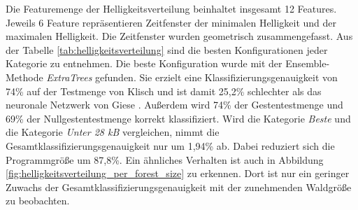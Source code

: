 Die Featuremenge der Helligkeitsverteilung beinhaltet insgesamt 12 Features. Jeweils 6 Feature repräsentieren Zeitfenster der minimalen Helligkeit und der maximalen Helligkeit. Die Zeitfenster wurden
geometrisch zusammengefasst.
\newline
\newline
Aus der Tabelle \ref{tab:helligkeitsverteilung} sind die besten Konfigurationen jeder Kategorie zu entnehmen. Die beste Konfiguration wurde mit der Ensemble-Methode \textit{ExtraTrees} gefunden.
Sie erzielt eine Klassifizierungsgenauigkeit von 74\% auf der Testmenge von Klisch und ist damit 25,2\% schlechter als das neuronale Netzwerk von Giese \cite{gieseThesis}. Außerdem wird 74\% der Gestentestmenge
und 69\% der Nullgestentestmenge korrekt klassifiziert.
\newline
\newline
Wird die Kategorie \textit{Beste} und die Kategorie \textit{Unter 28 kB} vergleichen, nimmt die Gesamtklassifizierungsgenauigkeit nur um 1,94\% ab. Dabei reduziert sich die Programmgröße um 87,8\%.
Ein ähnliches Verhalten ist auch in Abbildung \ref{fig:helligkeitsverteilung_per_forest_size} zu erkennen. Dort ist nur ein geringer Zuwachs der Gesamtklassifizierungsgenauigkeit mit der zunehmenden
Waldgröße zu beobachten.